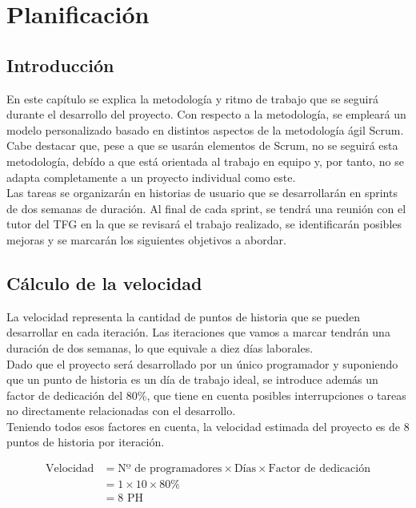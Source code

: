 \chapter{Planificación}

\section{Introducción}

En este capítulo se explica la metodología y ritmo de trabajo que se seguirá durante el desarrollo del proyecto. Con respecto a la metodología, se empleará un modelo personalizado basado en distintos aspectos de la metodología ágil Scrum. Cabe destacar que, pese a que se usarán elementos de Scrum, no se seguirá esta metodología, debído a que está orientada al trabajo en equipo y, por tanto, no se adapta completamente a un proyecto individual como este. \\

Las tareas se organizarán en historias de usuario que se desarrollarán en sprints de dos semanas de duración. Al final de cada sprint, se tendrá una reunión con el tutor del TFG en la que se revisará el trabajo realizado, se identificarán posibles mejoras y se marcarán los siguientes objetivos a abordar.

\section{Cálculo de la velocidad}

La velocidad representa la cantidad de puntos de historia que se pueden desarrollar en cada iteración. Las iteraciones que vamos a marcar tendrán una duración de dos semanas, lo que equivale a diez días laborales. \\

Dado que el proyecto será desarrollado por un único programador y suponiendo que un punto de historia es un día de trabajo ideal, se introduce además un factor de dedicación del 80\%, que tiene en cuenta posibles interrupciones o tareas no directamente relacionadas con el desarrollo. \\

Teniendo todos esos factores en cuenta, la velocidad estimada del proyecto es de 8 puntos de historia por iteración.

\[
\begin{aligned}
\text{Velocidad} &= \text{Nº de programadores} \times \text{Días} \times \text{Factor de dedicación} \\
&= 1 \times 10 \times 80\% \\
&= 8 \text{ PH}
\end{aligned}
\]

